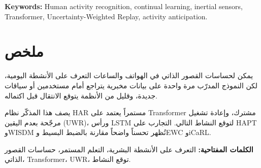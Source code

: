 \bigskip
\noindent\textbf{Keywords:} Human activity recognition, continual learning, inertial
sensors, Transformer, Uncertainty-Weighted Replay, activity anticipation.

\clearpage

\chapter*{\hfill \textarabic{ملخص}}

\begin{otherlanguage}{arabic}
\noindent
\textarabic{%
يمكن لحساسات القصور الذاتي في الهواتف والساعات التعرف على الأنشطة اليومية،
لكن النموذج المدرّب مرة واحدة على بيانات مخبرية يتراجع أمام مستخدمين أو سياقات
جديدة، وقليل من الأنظمة يتوقع الانتقال قبل اكتماله.}

\bigskip
\noindent
\textarabic{%
يصف هذا المذكّر نظام HAR مستمراً يعتمد على Transformer مشترك، وإعادة تشغيل
مرجّحة بعدم اليقين (UWR)، ورأس LSTM لتوقع النشاط التالي. التجارب على HAPT
وWISDM تُظهر تحسناً واضحاً مقارنة بالضبط البسيط وEWC وiCaRL.}

\bigskip
\noindent\textbf{\textarabic{الكلمات المفتاحية:}}
\textarabic{%
التعرف على الأنشطة البشرية، التعلم المستمر، حساسات القصور الذاتي،
Transformer، UWR، توقع النشاط.}
\end{otherlanguage}

